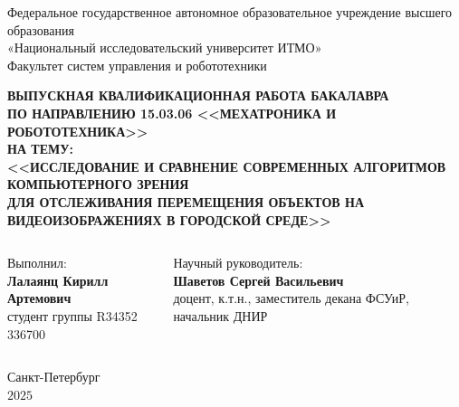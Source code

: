 \documentclass{beamer} %
\date{\today}
\begin{document}
\begin{frame}
  \begin{center}\tiny
    Федеральное государственное автономное образовательное учреждение высшего образования \\
    «Национальный исследовательский университет ИТМО»\\
    Факультет систем управления и робототехники
  \end{center}

  \begin{center}\tiny
    \textbf{\MakeUppercase{ВЫПУСКНАЯ КВАЛИФИКАЦИОННАЯ РАБОТА БАКАЛАВРА \\ ПО НАПРАВЛЕНИЮ 15.03.06 <<Мехатроника и робототехника>>}}\\
    \vspace{0.2cm}
    \textbf{\MakeUppercase{на тему:}}\\
    \vspace{0.1cm}
    \textbf{\MakeUppercase{<<Исследование и сравнение современных алгоритмов
    компьютерного зрения \\ для отслеживания перемещения объектов на видеоизображениях в
    городской среде>>}}
  \end{center}

  \vspace{0.3cm}

  \begin{columns}
    \begin{column}{0.50\textwidth}
      \begin{center}\small
        Выполнил: \\
        \vspace{0.1cm}
        \textbf{Лалаянц Кирилл Артемович}\\
        студент группы R34352 \\
        336700\\
      \end{center}
    \end{column}

    \begin{column}{0.50\textwidth}
      \begin{center}\small
        Научный руководитель:\\
        \vspace{0.1cm}
        \textbf{Шаветов Сергей Васильевич} \\
        доцент, к.т.н., заместитель декана ФСУиР,
        начальник ДНИР \\
      \end{center}
    \end{column}
  \end{columns}

  \vspace{0.5cm}
  \begin{center}\tiny
    Санкт-Петербург \\
    $2025$
  \end{center}
\end{frame}
\end{document}
